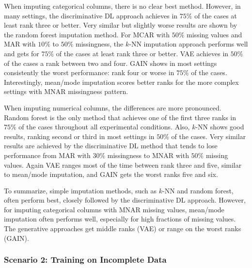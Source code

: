 \documentclass[utf8]{frontiersSCNS} %
\begin{document}
When imputing categorical columns, there is no clear best method. However, in many settings, the discriminative DL approach achieves in $75\%$ of the cases at least rank three or better. Very similar but slightly worse results are shown by the random forest imputation method. For MCAR with $50\%$ missing values and MAR with $10\%$ to $50\%$ missingness, the $k$-NN imputation approach performs well and gets for $75\%$ of the cases at least rank three or better. VAE achieves in $50\%$ of the cases a rank between two and four. GAIN shows in most settings consistently the worst performance: rank four or worse in $75\%$ of the cases. Interestingly, mean/mode imputation scores better ranks for the more complex settings with MNAR missingness pattern.

When imputing numerical columns, the differences are more pronounced. Random forest is the only method that achieves one of the first three ranks in $75\%$ of the cases throughout all experimental conditions. Also, $k$-NN shows good results, ranking second or third in most settings in $50\%$ of the cases. Very similar results are achieved by the discriminative DL method that tends to lose performance from MAR with $30\%$ missingness to MNAR with $50\%$ missing values. Again VAE ranges most of the time between rank three and five, similar to mean/mode imputation, and GAIN gets the worst ranks five and six.

To summarize, simple imputation methods, such as $k$-NN and random forest, often perform best, closely followed by the discriminative DL approach. However, for imputing categorical columns with MNAR missing values, mean/mode imputation often performs well, especially for high fractions of missing values. The generative approaches get middle ranks (VAE) or range on the worst ranks (GAIN).

\subsubsection{Scenario 2: Training on Incomplete Data}
\end{document}
